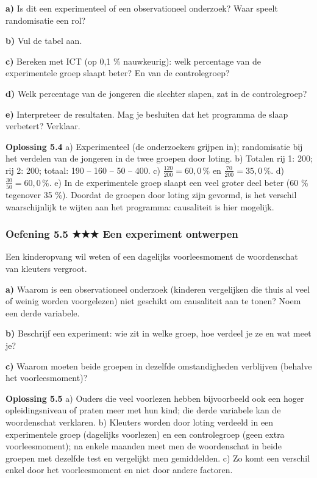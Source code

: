 \textbf{a)} Is dit een experimenteel of een observationeel onderzoek? Waar speelt randomisatie een rol? \lijn

\textbf{b)} Vul de tabel aan. \lijn

\textbf{c)} Bereken met ICT (op 0,1 \% nauwkeurig): welk percentage van de experimentele groep slaapt beter? En van de controlegroep? \lijn

\textbf{d)} Welk percentage van de jongeren die slechter slapen, zat in de controlegroep? \lijn

\textbf{e)} Interpreteer de resultaten. Mag je besluiten dat het programma de slaap verbetert? Verklaar. \lijn

\begin{oplossing}
\textbf{Oplossing 5.4} \quad a) Experimenteel (de onderzoekers grijpen in); randomisatie bij het verdelen van de jongeren in de twee groepen door loting. b) Totalen rij 1: 200; rij 2: 200; totaal: 190 – 160 – 50 – 400. c) $\frac{120}{200}=60{,}0\,\%$ en $\frac{70}{200}=35{,}0\,\%$. d) $\frac{30}{50}=60{,}0\,\%$. e) In de experimentele groep slaapt een veel groter deel beter (60 \% tegenover 35 \%). Doordat de groepen door loting zijn gevormd, is het verschil waarschijnlijk te wijten aan het programma: causaliteit is hier mogelijk.
\end{oplossing}

\subsubsection*{Oefening 5.5 \quad ★★★ \quad Een experiment ontwerpen}

Een kinderopvang wil weten of een dagelijks voorleesmoment de woordenschat van kleuters vergroot.

\textbf{a)} Waarom is een observationeel onderzoek (kinderen vergelijken die thuis al veel of weinig worden voorgelezen) niet geschikt om causaliteit aan te tonen? Noem een derde variabele. \lijn

\textbf{b)} Beschrijf een experiment: wie zit in welke groep, hoe verdeel je ze en wat meet je? \lijn

\textbf{c)} Waarom moeten beide groepen in dezelfde omstandigheden verblijven (behalve het voorleesmoment)? \lijn

\begin{oplossing}
\textbf{Oplossing 5.5} \quad a) Ouders die veel voorlezen hebben bijvoorbeeld ook een hoger opleidingsniveau of praten meer met hun kind; die derde variabele kan de woordenschat verklaren. b) Kleuters worden door loting verdeeld in een experimentele groep (dagelijks voorlezen) en een controlegroep (geen extra voorleesmoment); na enkele maanden meet men de woordenschat in beide groepen met dezelfde test en vergelijkt men gemiddelden. c) Zo komt een verschil enkel door het voorleesmoment en niet door andere factoren.
\end{oplossing}


